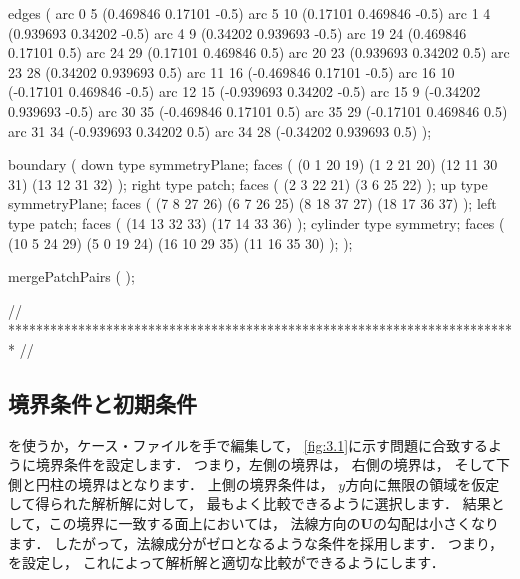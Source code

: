 \begin{OFverbatim}
edges           
(
    arc 0 5 (0.469846 0.17101 -0.5)
    arc 5 10 (0.17101 0.469846 -0.5)
    arc 1 4 (0.939693 0.34202 -0.5)
    arc 4 9 (0.34202 0.939693 -0.5)
    arc 19 24 (0.469846 0.17101 0.5)
    arc 24 29 (0.17101 0.469846 0.5)
    arc 20 23 (0.939693 0.34202 0.5)
    arc 23 28 (0.34202 0.939693 0.5)
    arc 11 16 (-0.469846 0.17101 -0.5)
    arc 16 10 (-0.17101 0.469846 -0.5)
    arc 12 15 (-0.939693 0.34202 -0.5)
    arc 15 9 (-0.34202 0.939693 -0.5)
    arc 30 35 (-0.469846 0.17101 0.5)
    arc 35 29 (-0.17101 0.469846 0.5)
    arc 31 34 (-0.939693 0.34202 0.5)
    arc 34 28 (-0.34202 0.939693 0.5)
);

boundary
(
    down
    {
        type symmetryPlane;
        faces
        (
            (0 1 20 19)
            (1 2 21 20)
            (12 11 30 31)
            (13 12 31 32)
        );
    }
    right
    {
        type patch;
        faces
        (
            (2 3 22 21)
            (3 6 25 22)
        );
    }
    up
    {
        type symmetryPlane;
        faces
        (
            (7 8 27 26)
            (6 7 26 25)
            (8 18 37 27)
            (18 17 36 37)
        );
    }
    left
    {
        type patch;
        faces
        (
            (14 13 32 33)
            (17 14 33 36)
        );
    }
    cylinder
    {
        type symmetry;
        faces
        (
            (10 5 24 29)
            (5 0 19 24)
            (16 10 29 35)
            (11 16 35 30)
        );
    }
);

mergePatchPairs
(
);

// ************************************************************************* //
\end{OFverbatim}

\subsection{境界条件と初期条件}
\label{ssec:3.1.4}
を使うか，ケース・ファイルを手で編集して，
\autoref{fig:3.1}に示す問題に合致するように境界条件を設定します．
つまり，左側の境界は，
右側の境界は，
そして下側と円柱の境界はとなります．
上側の境界条件は，
$y$方向に無限の領域を仮定して得られた解析解に対して，
最もよく比較できるように選択します．
結果として，この境界に一致する面上においては，
法線方向の$\bm{U}$の勾配は小さくなります．
したがって，法線成分がゼロとなるような条件を採用します．
つまり，を設定し，
これによって解析解と適切な比較ができるようにします．


